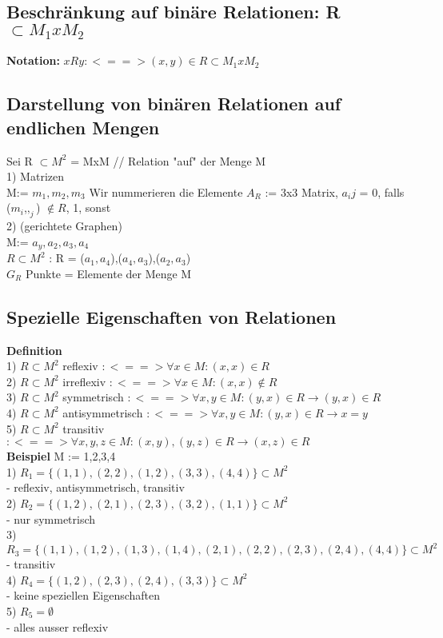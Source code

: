 \documentclass[11pt,a4paper]{article}
\begin{document}
\subsection{Beschränkung auf binäre Relationen: R $\subset M_1xM_2$}
\textbf{Notation:} $ xRy : <==> (x,y) \in R \subset M_1 x M_2$ \\
\subsection{Darstellung von binären Relationen auf endlichen Mengen}
Sei {R} $\subset M^2$ = MxM // Relation "auf" der Menge M \\
1) Matrizen\\
M:= {$m_1,m_2,m_3$} Wir nummerieren die Elemente
$A_R$ := 3x3 Matrix, $a_ij$ = {0, falls ($m_i$,$,_j$) $\not\in R$, 1, sonst }\\
2) (gerichtete Graphen) \\
M:= {$a_y,a_2,a_3,a_4$}\\
$R\subset M^2$ : R = {($a_1,a_4$),($a_4,a_3$),($a_2,a_3$)}\\
$G_R$ Punkte = Elemente der Menge M

\subsection{Spezielle Eigenschaften von Relationen}
\textbf{Definition}\\
1) $R \subset M^2$ reflexiv $: <==> \forall x \in M : (x,x) \in R$ \\
2) $R \subset M^2$ irreflexiv $: <==> \forall x \in M : (x,x) \not\in R$ \\
3) $R \subset M^2$ symmetrisch $: <==> \forall x,y \in M : (y,x) \in R \rightarrow (y,x) \in R$ \\
4) $R \subset M^2$ antisymmetrisch $: <==> \forall x,y \in M : (y,x) \in R \rightarrow x=y $\\
5) $R \subset M^2$ transitiv $: <==> \forall x,y,z \in M : (x,y),(y,z) \in R \rightarrow (x,z)\in R$ \\

\textbf{Beispiel} M := {1,2,3,4}\\
1) $R_1 = \{ (1,1),(2,2),(1,2),(3,3),(4,4)\} \subset M^2$\\
- reflexiv, antisymmetrisch, transitiv\\
2) $R_2 = \{ (1,2),(2,1),(2,3),(3,2),(1,1)\} \subset M^2$\\
- nur symmetrisch\\
3) $R_3 = \{ (1,1),(1,2),(1,3),(1,4),(2,1),(2,2),(2,3),(2,4),(4,4)\} \subset M^2$\\
- transitiv \\
4) $R_4 = \{ (1,2),(2,3),(2,4),(3,3)\} \subset M^2$\\
- keine speziellen Eigenschaften\\
5) $R_5 = \emptyset $\\
- alles ausser reflexiv
\end{document}
